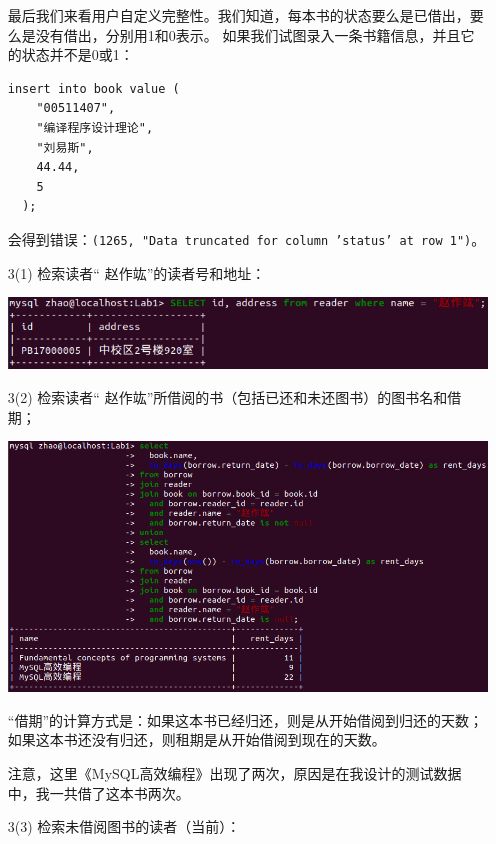 \documentclass[UTF8,zihao=-4]{ctexart}
\begin{document}
\begin{enumerate}
		最后我们来看用户自定义完整性。我们知道，每本书的状态要么是已借出，要么是没有借出，分别用1和0表示。
		如果我们试图录入一条书籍信息，并且它的状态并不是0或1：
		\begin{lstlisting}
insert into book value (
    "00511407",
    "编译程序设计理论",
    "刘易斯",
    44.44,
    5
  );
		\end{lstlisting}
		会得到错误：\texttt{(1265, "Data truncated for column 'status' at row 1")}。
		\item[3(1)] 检索读者``{ 赵作竑}''的读者号和地址：
		\begin{center}
			\includegraphics[width=\linewidth]{3-1.png}
		\end{center} 
		\item[3(2)] 检索读者``{ 赵作竑}''所借阅的书（包括已还和未还图书）的图书名和借期；
		\begin{center}
			\includegraphics[width=\linewidth]{3-2.png}
		\end{center}
		``借期''的计算方式是：如果这本书已经归还，则是从开始借阅到归还的天数；如果这本书还没有归还，则租期是从开始借阅到现在的天数。

		注意，这里《MySQL高效编程》出现了两次，原因是在我设计的测试数据中，我一共借了这本书两次。
		\item[3(3)] 检索未借阅图书的读者（当前）：
		

\end{enumerate}
\end{document}
